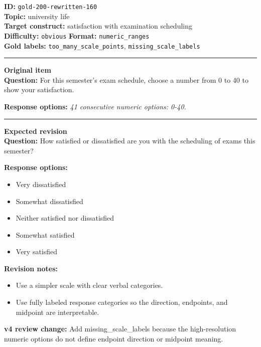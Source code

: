 \documentclass[10pt,a4paper]{article}
\newcommand{\sectionline}{\vspace{0.15em}\hrule\vspace{0.35em}}
\begin{document}
\begin{tcolorbox}[colframe=FlawRed,colback=white,colbacktitle=FlawRed!9,coltitle=black,title={Item 160\hfill Flawed item}]
\textbf{ID:} \texttt{gold-200-rewritten-160}\\
\textbf{Topic:} university life\\
\textbf{Target construct:} satisfaction with examination scheduling\\
\textbf{Difficulty:} \texttt{obvious} \quad \textbf{Format:} \texttt{numeric\_ranges}\\
\textbf{Gold labels:} \texttt{too\_many\_scale\_points}, \texttt{missing\_scale\_labels}\\
\sectionline
\textbf{Original item}\\
\textbf{Question:} For this semester's exam schedule, choose a number from 0 to 40 to show your satisfaction.
\par\textbf{Response options:}
\textit{41 consecutive numeric options: 0-40.}
\sectionline
\textbf{Expected revision}\\
\textbf{Question:} How satisfied or dissatisfied are you with the scheduling of exams this semester?
\par\textbf{Response options:}
\begin{itemize}
\item Very dissatisfied
\item Somewhat dissatisfied
\item Neither satisfied nor dissatisfied
\item Somewhat satisfied
\item Very satisfied
\end{itemize}
\par\textbf{Revision notes:}
\begin{itemize}
\item Use a simpler scale with clear verbal categories.
\item Use fully labeled response categories so the direction, endpoints, and midpoint are interpretable.
\end{itemize}
\par\textbf{v4 review change:} Add missing\_scale\_labels because the high-resolution numeric options do not define endpoint direction or midpoint meaning.
\end{tcolorbox}
\end{document}
